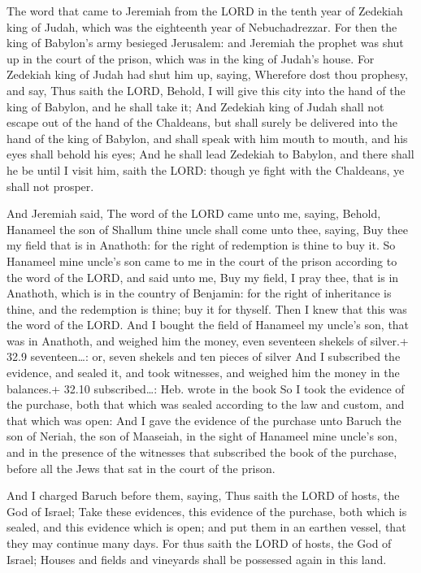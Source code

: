  The word that came to Jeremiah from the LORD in the tenth
year of Zedekiah king of Judah, which was the eighteenth year of
Nebuchadrezzar.  For then the king of Babylon's army
besieged Jerusalem: and Jeremiah the prophet was shut up in the court of
the prison, which was in the king of Judah's house.  For
Zedekiah king of Judah had shut him up, saying, Wherefore dost thou
prophesy, and say, Thus saith the LORD, Behold, I will give this city
into the hand of the king of Babylon, and he shall take it; 
And Zedekiah king of Judah shall not escape out of the hand of the
Chaldeans, but shall surely be delivered into the hand of the king of
Babylon, and shall speak with him mouth to mouth, and his eyes shall
behold his eyes;  And he shall lead Zedekiah to Babylon, and
there shall he be until I visit him, saith the LORD: though ye fight
with the Chaldeans, ye shall not prosper.

 And Jeremiah said, The word of the LORD came unto me,
saying,  Behold, Hanameel the son of Shallum thine uncle
shall come unto thee, saying, Buy thee my field that is in Anathoth: for
the right of redemption is thine to buy it.  So Hanameel
mine uncle's son came to me in the court of the prison according to the
word of the LORD, and said unto me, Buy my field, I pray thee, that is
in Anathoth, which is in the country of Benjamin: for the right of
inheritance is thine, and the redemption is thine; buy it for thyself.
Then I knew that this was the word of the LORD.  And I
bought the field of Hanameel my uncle's son, that was in Anathoth, and
weighed him the money, even seventeen shekels of silver.+ 32.9
seventeen\ldots: or, seven shekels and ten pieces of silver
 And I subscribed the evidence, and sealed it, and took
witnesses, and weighed him the money in the balances.+ 32.10
subscribed\ldots: Heb. wrote in the book  So I took the
evidence of the purchase, both that which was sealed according to the
law and custom, and that which was open:  And I gave the
evidence of the purchase unto Baruch the son of Neriah, the son of
Maaseiah, in the sight of Hanameel mine uncle's son, and in the presence
of the witnesses that subscribed the book of the purchase, before all
the Jews that sat in the court of the prison.

 And I charged Baruch before them, saying, 
Thus saith the LORD of hosts, the God of Israel; Take these evidences,
this evidence of the purchase, both which is sealed, and this evidence
which is open; and put them in an earthen vessel, that they may continue
many days.  For thus saith the LORD of hosts, the God of
Israel; Houses and fields and vineyards shall be possessed again in this
land.


